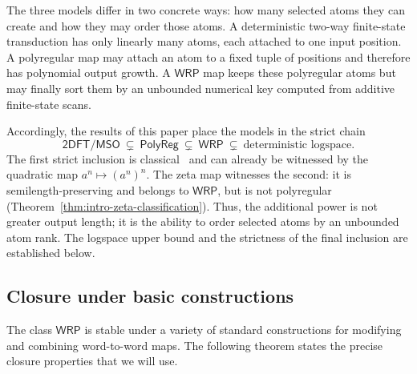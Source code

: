 \documentclass[11pt]{article}
\theoremstyle{definition}
\newcommand{\WRP}{\mathsf{WRP}}
\newcommand{\TDFT}{\mathsf{2DFT}}
\newcommand{\MSO}{\mathsf{MSO}}
\newcommand{\polyreg}{\mathsf{PolyReg}}
\begin{document}
The three models differ in two concrete ways: how many selected atoms they can
create and how they may order those atoms.  A deterministic two-way
finite-state transduction has only linearly many atoms, each attached to one
input position.  A polyregular map may attach an atom to a fixed tuple of
positions and therefore has polynomial output growth.  A $\WRP$ map keeps
these polyregular atoms but may finally sort them by an unbounded numerical
key computed from additive finite-state scans.

Accordingly, the results of this paper place the models in the strict chain
\[
   \TDFT/\MSO\ \subsetneq\ \polyreg\ \subsetneq\ \WRP
   \ \subsetneq\ \text{deterministic logspace}.
\]
The first strict inclusion is classical~\cite{Bojanczyk2018,
BojanczykKieferLhote2019} and can already be witnessed by the quadratic map
$a^n\mapsto(a^n)^n$.  The zeta map witnesses the second:
it is semilength-preserving and belongs to $\WRP$, but is not polyregular
(Theorem~\ref{thm:intro-zeta-classification}).  Thus, the additional power is
not greater output length; it is the ability to order selected atoms by an
unbounded atom rank.  The logspace upper bound and the strictness of the final
inclusion are established below.


\subsection{Closure under basic constructions}

The class $\WRP$ is stable under a variety of standard constructions for
modifying and combining word-to-word maps.  The following theorem states the
precise closure properties that we will use.
\end{document}
